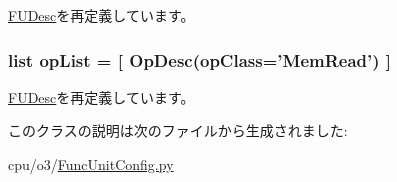 \hyperlink{classFuncUnit_1_1FUDesc_adf167b42e49fa9d4114bff901e1b1c29}{FUDesc}を再定義しています。\hypertarget{classFuncUnitConfig_1_1ReadPort_a31b2f9e3ac9a504397b140f513c469cc}{
\subsubsection[{opList}]{\setlength{\rightskip}{0pt plus 5cm}list {\bf opList} = \mbox{[} {\bf OpDesc}(opClass='MemRead') \mbox{]}}}
\label{classFuncUnitConfig_1_1ReadPort_a31b2f9e3ac9a504397b140f513c469cc}


\hyperlink{classFuncUnit_1_1FUDesc_aa7a0c51c9e0149c27f9e38f86005dfbe}{FUDesc}を再定義しています。

このクラスの説明は次のファイルから生成されました:\begin{DoxyCompactItemize}
\item 
cpu/o3/\hyperlink{FuncUnitConfig_8py}{FuncUnitConfig.py}\end{DoxyCompactItemize}
